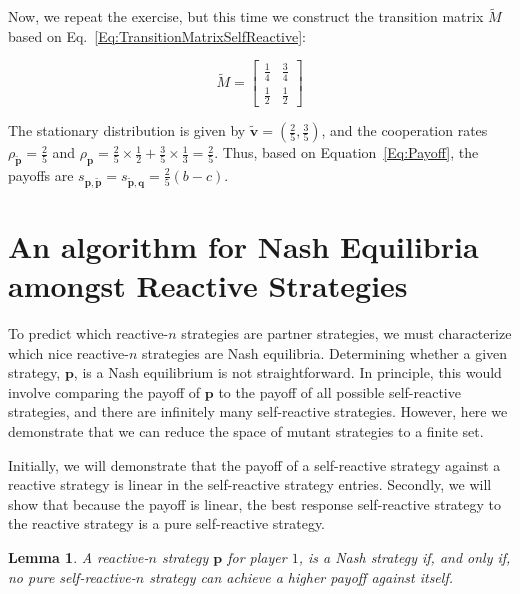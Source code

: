 \documentclass[11pt]{article}
\theoremstyle{plainCl1}
\newtheorem{lemma}[theorem]{Lemma}
\theoremstyle{plainCl2}
\begin{document}
Now, we repeat the exercise, but this time we construct the transition matrix
$\tilde{M}$ based on Eq.~\eqref{Eq:TransitionMatrixSelfReactive}:

$$
\tilde{M} = 
\begin{bmatrix}
  \frac{1}{4} & \frac{3}{4}\\[6pt]
  \frac{1}{2} & \frac{1}{2}
\end{bmatrix}
$$

The stationary distribution is given by $\mathbf{\tilde{v}} = \left(\frac{2}{5},
\frac{3}{5}\right)$, and the cooperation rates $\rho_\mathbf{\tilde{p}} =
\frac{2}{5}$ and $\rho_\mathbf{p} = \frac{2}{5} \times \frac{1}{2} + \frac{3}{5}
\times \frac{1}{3} = \frac{2}{5}$. Thus, based on Equation~\eqref{Eq:Payoff},
the payoffs are $s_{\mathbf{p}, \mathbf{\tilde{p}}} = s_{\mathbf{\tilde{p}},
\mathbf{q}} = \frac{2}{5}(b - c)$.


\section{An algorithm for Nash Equilibria amongst Reactive Strategies}\label{section:algorithm_for_nash}

To predict which reactive-$n$ strategies are partner strategies, we must
characterize which nice reactive-$n$ strategies are Nash equilibria. Determining
whether a given strategy, $\mathbf{p}$, is a Nash equilibrium is not
straightforward. In principle, this would involve comparing the payoff of
$\mathbf{p}$ to the payoff of all possible self-reactive strategies, and there
are infinitely many self-reactive strategies. However, here we demonstrate that
we can reduce the space of mutant strategies to a finite set.

Initially, we will demonstrate that the payoff of a self-reactive strategy
against a reactive strategy is linear in the self-reactive strategy entries.
Secondly, we will show that because the payoff is linear, the best response
self-reactive strategy to the reactive strategy is a pure self-reactive
strategy.

\begin{lemma}\label{lemma:nash_against_pure_self_reactive} 
A reactive-$n$ strategy $\mathbf{p}$ for player $1$, is a \textit{Nash strategy}
if, and only if, no pure self-reactive-$n$ strategy can achieve a higher payoff
against itself.
\end{lemma}
\end{document}
